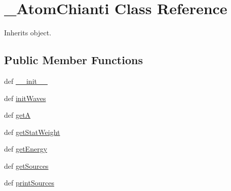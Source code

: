 \hypertarget{classpyneb_1_1utils_1_1pn__chianti_1_1___atom_chianti}{\section{\-\_\-\-Atom\-Chianti Class Reference}
\label{classpyneb_1_1utils_1_1pn__chianti_1_1___atom_chianti}
}


Inherits object.

\subsection*{Public Member Functions}
\begin{DoxyCompactItemize}
\item 
def \hyperlink{classpyneb_1_1utils_1_1pn__chianti_1_1___atom_chianti_ac775ee34451fdfa742b318538164070e}{\-\_\-\-\_\-init\-\_\-\-\_\-}
\item 
def \hyperlink{classpyneb_1_1utils_1_1pn__chianti_1_1___atom_chianti_a585a5ccbf1996b61e811632daf83d9a5}{init\-Waves}
\item 
def \hyperlink{classpyneb_1_1utils_1_1pn__chianti_1_1___atom_chianti_a17192519660871ef6a77e6bdad6f580d}{get\-A}
\item 
def \hyperlink{classpyneb_1_1utils_1_1pn__chianti_1_1___atom_chianti_a00fb8d8bc6381e46ebb1b76b2770442a}{get\-Stat\-Weight}
\item 
def \hyperlink{classpyneb_1_1utils_1_1pn__chianti_1_1___atom_chianti_a8406acc27904d955ee4dbb458f60db52}{get\-Energy}
\item 
def \hyperlink{classpyneb_1_1utils_1_1pn__chianti_1_1___atom_chianti_a13685d48c0180c5463a5dffebcd4fb29}{get\-Sources}
\item 
def \hyperlink{classpyneb_1_1utils_1_1pn__chianti_1_1___atom_chianti_a0120b7dbd5f911f8b1df2d2cebf6c09c}{print\-Sources}
\end{DoxyCompactItemize}
